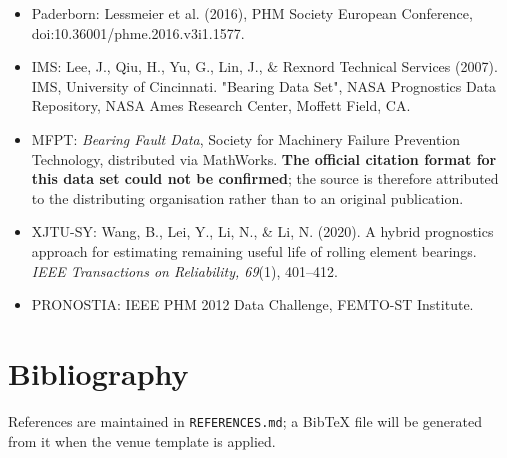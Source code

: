 \documentclass[11pt]{article}
\newcommand{\code}[1]{\texttt{#1}}
\begin{document}
\begin{itemize}
  \item Paderborn: Lessmeier et al. (2016), PHM Society European Conference, doi:10.36001/phme.2016.v3i1.1577.
  \item IMS: Lee, J., Qiu, H., Yu, G., Lin, J., \& Rexnord Technical Services (2007). IMS, University of Cincinnati. "Bearing Data Set", NASA Prognostics Data Repository, NASA Ames Research Center, Moffett Field, CA.
  \item MFPT: \emph{Bearing Fault Data}, Society for Machinery Failure Prevention Technology, distributed via MathWorks. \textbf{The official citation format for this data set could not be confirmed}; the source is therefore attributed to the distributing organisation rather than to an original publication.
  \item XJTU-SY: Wang, B., Lei, Y., Li, N., \& Li, N. (2020). A hybrid prognostics approach for estimating remaining useful life of rolling element bearings. \emph{IEEE Transactions on Reliability, 69}(1), 401--412.
  \item PRONOSTIA: IEEE PHM 2012 Data Challenge, FEMTO-ST Institute.
\end{itemize}

\section*{Bibliography}
References are maintained in \code{REFERENCES.md}; a BibTeX file will be generated from it when the venue template is applied.
\end{document}
